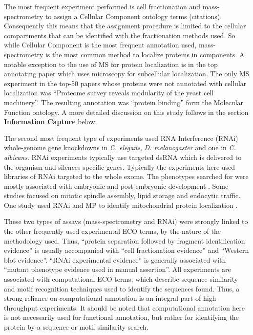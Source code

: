 \documentclass[12pt]{article}
\begin{document}
The most frequent experiment performed is cell fractionation and mass-spectrometry to assign a
Cellular Component ontology terms (citations).  Consequently this means that the assignment
procedure is limited to the cellular compartments that can be identified with the fractionation
methods used\cite{MS-papers}. So while Cellular Component is the most frequent annotation used,
mass-spectrometry is the most common method to localize proteins in components. A notable exception
to the use of MS for protein localization is in the top annotating paper \cite{18029348} which uses
microscopy for subcellular localization. The only MS experiment in the top-50 papers 
whose proteins were not annotated with cellular localization was ``Proteome survey reveals
modularity of the yeast cell machinery''\cite{18029348}. The resulting annotation was ``protein
binding'' form the Molecular Function ontology. A more detailed discussion on this study follows in
the section \textbf{Information Capture} below.

The second most frequent type of experiments used RNA Interference (RNAi) whole-genome gene
knockdowns in \textit{C. elegans}, \textit{D. melanogaster} and one in \textit{C. albicans}.  RNAi
experiments typically use targeted dsRNA which is delivered to the organism and silences specific
genes. Typically the experiments here used libraries of RNAi targeted to the whole exome. The
phenotypes searched for were mostly associated with embryonic and post-embryonic development
\cite{relevant papers}. Some studies focused on mitotic spindle assembly\cite{17412918}, lipid
storage\cite{17412918} and endocytic traffic\cite{17412918}. One study used RNAi and MP to identify
mitochondrial protein localization \cite{18433294}.

These two types of assays (mass-spectrometry and RNAi)  were strongly linked to the other
frequently used experimental ECO terms, by the nature of the methodology used. Thus, ``protein
separation followed by fragment identification evidence'' is usually accompanied with ``cell
fractionation evidence'' and ``Western blot evidence''. ``RNAi experimental evidence'' is
generally associated with ``mutant phenotype evidence used in manual assertion''. All experiments
are associated with computational ECO terms, which describe sequence similarity and motif
recognition techniques used to identify the sequences found. Thus, a strong reliance on
computational annotation is an integral part of high throughput experiments. It should be noted
that computational annotation here is not necessarily used for functional annotation, but rather
for identifying the protein by a sequence or motif similarity search.
\end{document}
